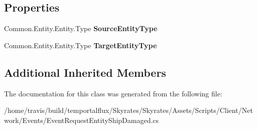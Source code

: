 \subsection*{Properties}
\begin{DoxyCompactItemize}
\item 
\hypertarget{class_skyrates_1_1_client_1_1_network_1_1_event_1_1_event_request_entity_ship_damaged_ad37861cbfed0eaf3c184b7b5a0fc1c34}{Common.\-Entity.\-Entity.\-Type {\bfseries Source\-Entity\-Type}}\label{class_skyrates_1_1_client_1_1_network_1_1_event_1_1_event_request_entity_ship_damaged_ad37861cbfed0eaf3c184b7b5a0fc1c34}

\item 
\hypertarget{class_skyrates_1_1_client_1_1_network_1_1_event_1_1_event_request_entity_ship_damaged_a354ad9e86575579cb021377c64f28ec6}{Common.\-Entity.\-Entity.\-Type {\bfseries Target\-Entity\-Type}}\label{class_skyrates_1_1_client_1_1_network_1_1_event_1_1_event_request_entity_ship_damaged_a354ad9e86575579cb021377c64f28ec6}

\end{DoxyCompactItemize}
\subsection*{Additional Inherited Members}


The documentation for this class was generated from the following file\-:\begin{DoxyCompactItemize}
\item 
/home/travis/build/temportalflux/\-Skyrates/\-Skyrates/\-Assets/\-Scripts/\-Client/\-Network/\-Events/Event\-Request\-Entity\-Ship\-Damaged.\-cs\end{DoxyCompactItemize}
